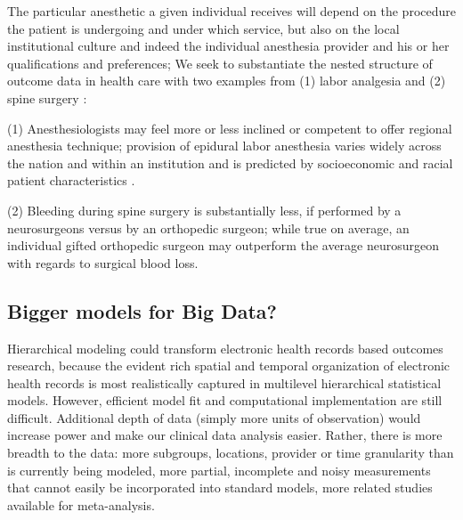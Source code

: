 \documentclass[11pt,notitlepage]{article}
\begin{document}
The particular anesthetic a given individual receives will depend on the procedure the patient is undergoing and under which service, but also on the local institutional culture and indeed the individual anesthesia provider and his or her qualifications and preferences\cite{AndreaeWhite2015}; We seek to substantiate the nested structure of outcome data in health care with two examples from (1) labor analgesia and (2) spine surgery : 

(1) Anesthesiologists may feel more or less inclined or competent to offer regional anesthesia technique; provision of epidural labor anesthesia varies widely across the nation and within an institution and is predicted by socioeconomic and racial patient characteristics \cite{Rust2004,Glance2007}.
 
(2) Bleeding during spine surgery is substantially less, if performed by a neurosurgeons versus by an orthopedic surgeon; while true on average, an individual gifted orthopedic surgeon may outperform the average neurosurgeon with regards to surgical blood loss.

\subsection*{Bigger models for Big Data?}
Hierarchical modeling could transform electronic health records based outcomes research, because the evident rich spatial and temporal organization of electronic health records is most realistically captured in multilevel hierarchical statistical models. However, efficient model fit and computational implementation are still difficult.  Additional depth of data (simply more units of observation) would increase power and make our clinical data analysis easier. Rather, there is more breadth to the data: more subgroups, locations, provider or time granularity than is currently being modeled, more partial, incomplete and noisy measurements that cannot easily be incorporated into standard models, more related studies available for meta-analysis\cite{Andreae2015,Andreae2012}.

\end{document}
